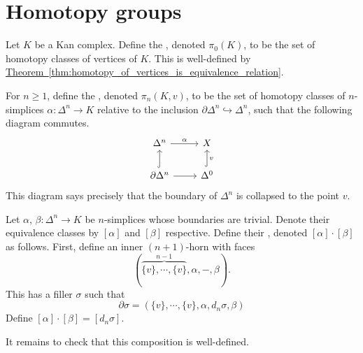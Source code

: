 \documentclass[main.tex]{subfiles}
\begin{document}
\section{Homotopy groups}
\label{sec:homotopy_groups}

\begin{definition}
  \label{def:homotopy_group}
  Let $K$ be a Kan complex. Define the , denoted $\pi_{0}(K)$, to be the set of homotopy classes of vertices of $K$. This is well-defined by \hyperref[thm:homotopy_of_vertices_is_equivalence_relation]{Theorem~\ref*{thm:homotopy_of_vertices_is_equivalence_relation}}.

  For $n \geq 1$, define the , denoted $\pi_{n}(K, v)$, to be the set of homotopy classes of $n$-simplices $\alpha\colon \Delta^{n} \to K$ relative to the inclusion $\partial\Delta^{n} \hookrightarrow \Delta^{n}$, such that the following diagram commutes.
  \begin{equation*}
    \begin{tikzcd}
      \Delta^{n}
      \arrow[r, "\alpha"]
      & X
      \\
      \partial\Delta^{n}
      \arrow[r]
      \arrow[u, hookrightarrow]
      & \Delta^{0}
      \arrow[u, swap, hookrightarrow, "v"]
    \end{tikzcd}
  \end{equation*}
  This diagram says precisely that the boundary of $\Delta^{n}$ is collapsed to the point $v$.
\end{definition}

\begin{definition}
  \label{def:composition_in_homotopy_groups}
  Let $\alpha$, $\beta\colon \Delta^{n} \to K$ be $n$-simplices whose boundaries are trivial. Denote their equivalence classes by $[\alpha]$ and $[\beta]$ respective. Define their , denoted $[\alpha]\cdot[\beta]$ as follows. First, define an inner $(n+1)$-horn with faces
  \begin{equation*}
    (\overbrace{\{v\}, \cdots, \{v\}}^{n-1}, \alpha, -, \beta).
  \end{equation*}
  This has a filler $\sigma$ such that
  \begin{equation*}
    \partial\sigma = (\{v\}, \cdots, \{v\}, \alpha, d_{n}\sigma, \beta)
  \end{equation*}
  Define $[\alpha]\cdot[\beta] = [d_{n}\sigma]$.

  It remains to check that this composition is well-defined.
\end{definition}
\end{document}

